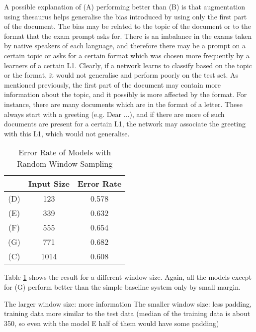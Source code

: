 A possible explanation of (A) performing better than (B) is that augmentation using thesaurus helps generalise the bias introduced by using only the first part of the document.
The bias may be related to the topic of the document or to the format that the exam prompt asks for.
There is an imbalance in the exams taken by native speakers of each language, and therefore there may be a prompt on a certain topic or asks for a certain format which was chosen more frequently by a learners of a certain L1. 
Clearly, if a network learns to classify based on the topic or the format, it would not generalise and perform poorly on the test set.
As mentioned previously, the first part of the document may contain more information about the topic, and it possibly is more affected by the format.
For instance, there are many documents which are in the format of a letter.
These always start with a greeting (e.g. Dear ...), and if there are more of such documents are present for a certain L1, the network may associate the greeting with this L1, which would not generalise.

\begin{table}[]
\centering
\caption{Error Rate of Models with Random Window Sampling}
\label{tab:r_w_s}
\begin{tabular}{ccc}
&Input Size & Error Rate \\ \hline
(D)&123        & 0.578      \\
(E)&339        & 0.632      \\
(F)&555        & 0.654      \\
(G)&771        & 0.682      \\
(C)&1014       & \color{red}0.608\color{black}    
\end{tabular}
\end{table}
Table \ref{tab:r_w_s} shows the result for a different window size.
Again, all the models except for (G) perform better than the simple baseline system only by small margin.


The larger window size:  more information
The smaller window size: less padding, training data more similar to the test data (median of the training data is about 350, so even with the model E half of them would have some padding) 